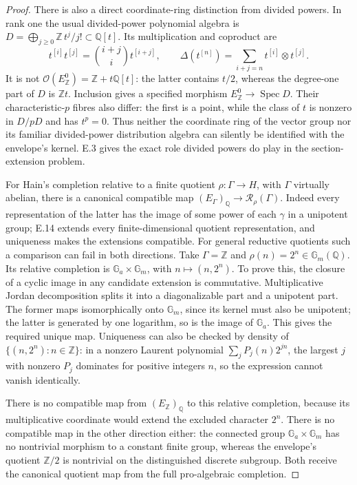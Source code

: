 \begin{proof}
There is also a direct coordinate-ring distinction from divided
powers.  In rank one the usual divided-power polynomial algebra is
\(D=\bigoplus_{j\geq0}\mathbb Z\,t^j/j!\subset\mathbb Q[t]\).
Its multiplication and coproduct are
\[
 t^{[i]}t^{[j]}=\binom{i+j}{i}t^{[i+j]},\qquad
 \Delta(t^{[n]})=\sum_{i+j=n}t^{[i]}\otimes t^{[j]}.
\]
It is not \(\mathcal O(E^0_{\mathbb Z})=\mathbb Z+t\mathbb Q[t]\):
the latter contains \(t/2\), whereas the degree-one part of
\(D\) is \(\mathbb Zt\).  Inclusion gives a specified morphism
\(E^0_{\mathbb Z}\to\operatorname{Spec}D\).
Their characteristic-\(p\) fibres also differ: the first is a
point, while the class of \(t\) is nonzero in \(D/pD\) and has
\(t^p=0\).  Thus neither the coordinate ring of the vector group
nor its familiar divided-power distribution algebra can silently
be identified with the envelope's kernel.  E.3 gives the exact
role divided powers do play in the section-extension problem.

For Hain's completion relative to a finite quotient
\(\rho:\Gamma\to H\), with \(\Gamma\) virtually abelian, there
is a canonical compatible map
\((E_\Gamma)_{\mathbb Q}\to\mathcal R_\rho(\Gamma)\).
Indeed every representation of the latter has the image of
some power of each \(\gamma\) in a unipotent group; E.14
extends every finite-dimensional quotient representation, and
uniqueness makes the extensions compatible.  For general
reductive quotients such a comparison can fail in both
directions.  Take \(\Gamma=\mathbb Z\) and
\(\rho(n)=2^n\in\mathbb G_m(\mathbb Q)\).  Its relative
completion is \(\mathbb G_a\times\mathbb G_m\), with
\(n\mapsto(n,2^n)\).  To prove this, the closure of a cyclic
image in any candidate extension is commutative.  Multiplicative
Jordan decomposition splits it into a diagonalizable part and
a unipotent part.  The former maps isomorphically onto
\(\mathbb G_m\), since its kernel must also be unipotent;
the latter is generated by one logarithm, so is the image of
\(\mathbb G_a\).  This gives the required unique map.
Uniqueness can also be checked by density of
\(\{(n,2^n):n\in\mathbb Z\}\): in a nonzero Laurent polynomial
\(\sum_jP_j(n)2^{jn}\), the largest \(j\) with nonzero
\(P_j\) dominates for positive integers \(n\), so the expression
cannot vanish identically.

There is no compatible map from \((E_{\mathbb Z})_{\mathbb Q}\)
to this relative completion, because its multiplicative
coordinate would extend the excluded character \(2^n\).
There is no compatible map in the other direction either:
the connected group \(\mathbb G_a\times\mathbb G_m\) has no
nontrivial morphism to a constant finite group, whereas the
envelope's quotient \(\mathbb Z/2\) is nontrivial on the
distinguished discrete subgroup.  Both receive the canonical
quotient map from the full pro-algebraic completion.
\end{proof}

